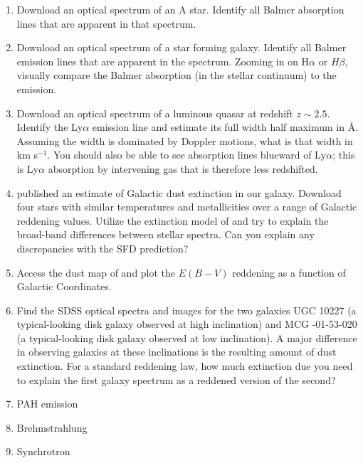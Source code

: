 \begin{enumerate}
\item Download an optical spectrum of an A star. Identify 
  all Balmer absorption lines that are apparent in that spectrum.
\item Download an optical spectrum of a star forming galaxy. Identify
all Balmer emission lines that are apparent in the spectrum. Zooming
in on H$\alpha$ or $H\beta$, visually compare the Balmer absorption
(in the stellar continuum) to the emission.
\item Download an optical spectrum of a luminous quasar at redshift $z\sim
2.5$. Identify the Ly$\alpha$ emission line and estimate its full
width half maximum in \AA. Assuming the width is dominated by Doppler
motions, what is that width in km s$^{-1}$. You should also be able to
see absorption lines blueward of Ly$\alpha$; this is Ly$\alpha$
absorption by intervening gas that is therefore less redshifted.
\item \citet{schlegel98a} published an estimate of Galactic dust
extinction in our galaxy. Download four stars with similar
temperatures and metallicities over a range of Galactic reddening
values. Utilize the extinction model of \citet{cardelli89a} and try to
explain the broad-band differences between stellar spectra. Can you
explain any discrepancies with the SFD prediction?
\item Access the dust map of \citet{schlegel98a} and plot the $E(B-V)$
    reddening as a function of Galactic Coordinates. 
\item Find the SDSS optical spectra and images for the two galaxies
UGC 10227 (a typical-looking disk galaxy observed at high inclination)
and MCG -01-53-020 (a typical-looking disk galaxy observed at low
inclination). A major difference in observing galaxies at these
inclinations is the resulting amount of dust extinction. For a
standard reddening law, how much extinction due you need to explain
the first galaxy spectrum as a reddened version of the second?
\item PAH emission
\item Brehmstrahlung
\item Synchrotron
\end{enumerate}


  

